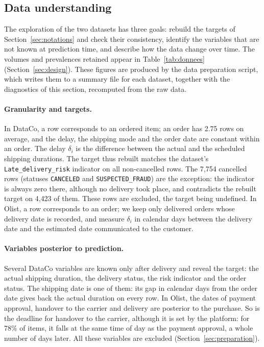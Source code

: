 \documentclass[11pt,a4paper]{article}
\theoremstyle{definition}
\begin{document}
\subsection{Data understanding}
\label{sec:data-understanding}

The exploration of the two datasets has three goals: rebuild the targets of Section~\ref{sec:notations} and check their consistency, identify the variables that are not known at prediction time, and describe how the data change over time. The volumes and prevalences retained appear in Table~\ref{tab:donnees} (Section~\ref{sec:design}). These figures are produced by the data preparation script, which writes them to a summary file for each dataset, together with the diagnostics of this section, recomputed from the raw data.

\paragraph{Granularity and targets.} In DataCo, a row corresponds to an ordered item; an order has 2.75 rows on average, and the delay, the shipping mode and the order date are constant within an order. The delay $\delta_i$ is the difference between the actual and the scheduled shipping durations. The target thus rebuilt matches the dataset's \texttt{Late\_delivery\_risk} indicator on all non-cancelled rows. The 7{,}754 cancelled rows (statuses \texttt{CANCELED} and \texttt{SUSPECTED\_FRAUD}) are the exception: the indicator is always zero there, although no delivery took place, and contradicts the rebuilt target on 4{,}423 of them. These rows are excluded, the target being undefined. In Olist, a row corresponds to an order; we keep only delivered orders whose delivery date is recorded, and measure $\delta_i$ in calendar days between the delivery date and the estimated date communicated to the customer.

\paragraph{Variables posterior to prediction.} Several DataCo variables are known only after delivery and reveal the target: the actual shipping duration, the delivery status, the risk indicator and the order status. The shipping date is one of them: its gap in calendar days from the order date gives back the actual duration on every row. In Olist, the dates of payment approval, handover to the carrier and delivery are posterior to the purchase. So is the deadline for handover to the carrier, although it is set by the platform: for 78\% of items, it falls at the same time of day as the payment approval, a whole number of days later. All these variables are excluded (Section~\ref{sec:preparation}).
\end{document}
